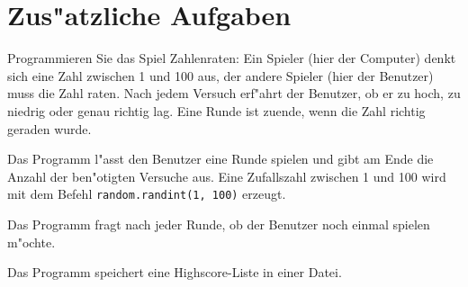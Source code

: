\section*{Zus"atzliche Aufgaben}

\begin{aufgabe}[Zahlenraten]
Programmieren Sie das Spiel Zahlenraten: Ein Spieler (hier der Computer) denkt sich eine Zahl zwischen 1 und 100 aus, der andere Spieler (hier der Benutzer) muss die Zahl raten. Nach jedem Versuch erf"ahrt der Benutzer, ob er zu hoch, zu niedrig oder genau richtig lag. Eine Runde ist zuende, wenn die Zahl richtig geraden wurde.
\begin{teilaufgabe}
Das Programm l"asst den Benutzer eine Runde spielen und gibt am Ende die Anzahl der ben"otigten Versuche aus. \hinweis Eine Zufallszahl zwischen 1 und 100 wird mit dem Befehl \lstinline{random.randint(1, 100)} erzeugt.
\end{teilaufgabe}
\begin{teilaufgabe}
Das Programm fragt nach jeder Runde, ob der Benutzer noch einmal spielen m"ochte.
\end{teilaufgabe}
\begin{teilaufgabe}
Das Programm speichert eine Highscore-Liste in einer Datei.
\end{teilaufgabe}

\end{aufgabe}


